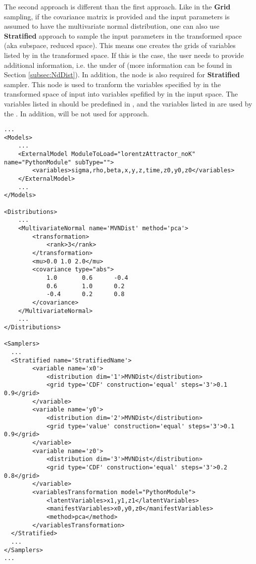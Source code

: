 The second approach is different than the first approach. Like in the \textbf{Grid} sampling, if the covariance matrix is provided
and the input parameters is assumed to have the multivariate normal distribution, one can also use \textbf{Stratified} approach to
sample the input parameters in the transformed space (aka subspace, reduced space). This means one creates
the grids of variables listed by  in the transformed space. If this is the case, the user needs to
provide additional information, i.e. the  under  of 
(more information can be found in Section \ref{subsec:NdDist}). In addition, the node  is also
required for \textbf{Stratified} sampler. This node is used to tranform the variables specified by  in the
transformed space of input into variables spefified by  in the input space. The variables listed
in  should be predefined in , and the variables listed in 
are used by the . In addition,  will be not used for approach.



\begin{lstlisting}[style=XML,morekeywords={ND,grid}]
...
<Models>
    ...
    <ExternalModel ModuleToLoad="lorentzAttractor_noK" name="PythonModule" subType="">
        <variables>sigma,rho,beta,x,y,z,time,z0,y0,z0</variables>
    </ExternalModel>
    ...
</Models>

<Distributions>
    ...
    <MultivariateNormal name='MVNDist' method='pca'>
        <transformation>
            <rank>3</rank>
        </transformation>
        <mu>0.0 1.0 2.0</mu>
        <covariance type="abs">
            1.0       0.6      -0.4
            0.6       1.0      0.2
            -0.4      0.2      0.8
        </covariance>
    </MultivariateNormal>
    ...
</Distributions>

<Samplers>
  ...
  <Stratified name='StratifiedName'>
        <variable name='x0'>
            <distribution dim='1'>MVNDist</distribution>
            <grid type='CDF' construction='equal' steps='3'>0.1 0.9</grid>
        </variable>
        <variable name='y0'>
            <distribution dim='2'>MVNDist</distribution>
            <grid type='value' construction='equal' steps='3'>0.1 0.9</grid>
        </variable>
        <variable name='z0'>
            <distribution dim='3'>MVNDist</distribution>
            <grid type='CDF' construction='equal' steps='3'>0.2 0.8</grid>
        </variable>
        <variablesTransformation model="PythonModule">
            <latentVariables>x1,y1,z1</latentVariables>
            <manifestVariables>x0,y0,z0</manifestVariables>
            <method>pca</method>
        </variablesTransformation>
  </Stratified>
  ...
</Samplers>
...
\end{lstlisting}

